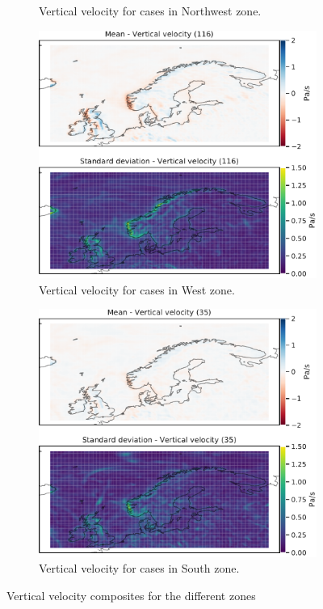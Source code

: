 \begin{figure}
\begin{subfigure}[b]{0.49\textwidth}
    \caption{Vertical velocity  for cases in Northwest zone.}
    \label{fig:NordWestW}
\end{subfigure}
\begin{subfigure}[b]{0.49\textwidth}
    \centering
    \includegraphics[width=\textwidth]{Figures/WVest.pdf}
    \caption{Vertical velocity  for cases in West zone.}
    \label{fig:WestW}
\end{subfigure}
\begin{subfigure}[b]{0.49\textwidth}
    \centering
    \includegraphics[width=\textwidth]{Figures/WSor.pdf}
    \caption{Vertical velocity  for cases in South zone.}
    \label{fig:SouthW}
\end{subfigure}
\caption{Vertical velocity composites for the different zones}
\label{fig:verticalzones}
\end{figure}

